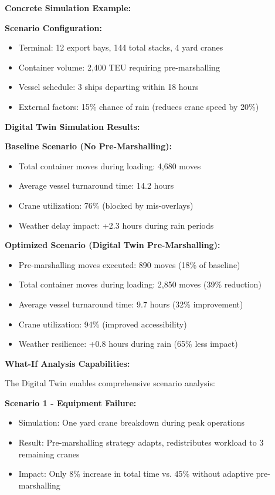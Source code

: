 \documentclass{article}
\begin{document}
\textbf{Concrete Simulation Example:}

\textbf{Scenario Configuration:}
\begin{itemize}
\item Terminal: 12 export bays, 144 total stacks, 4 yard cranes
\item Container volume: 2,400 TEU requiring pre-marshalling
\item Vessel schedule: 3 ships departing within 18 hours
\item External factors: 15\% chance of rain (reduces crane speed by 20\%)
\end{itemize}

\textbf{Digital Twin Simulation Results:}

\textbf{Baseline Scenario (No Pre-Marshalling):}
\begin{itemize}
\item Total container moves during loading: 4,680 moves
\item Average vessel turnaround time: 14.2 hours
\item Crane utilization: 76\% (blocked by mis-overlays)
\item Weather delay impact: +2.3 hours during rain periods
\end{itemize}

\textbf{Optimized Scenario (Digital Twin Pre-Marshalling):}
\begin{itemize}
\item Pre-marshalling moves executed: 890 moves (18\% of baseline)
\item Total container moves during loading: 2,850 moves (39\% reduction)
\item Average vessel turnaround time: 9.7 hours (32\% improvement)
\item Crane utilization: 94\% (improved accessibility)
\item Weather resilience: +0.8 hours during rain (65\% less impact)
\end{itemize}

\textbf{What-If Analysis Capabilities:}

The Digital Twin enables comprehensive scenario analysis:

\textbf{Scenario 1 - Equipment Failure:}
\begin{itemize}
\item Simulation: One yard crane breakdown during peak operations
\item Result: Pre-marshalling strategy adapts, redistributes workload to 3 remaining cranes
\item Impact: Only 8\% increase in total time vs. 45\% without adaptive pre-marshalling
\end{itemize}
\end{document}
